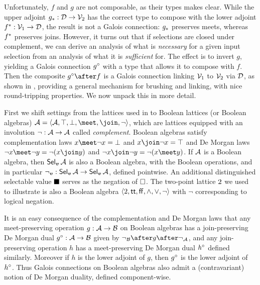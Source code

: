 
\vspace{-1mm}

\noindent Unfortunately, $f$ and $g$ are not composable, as their types makes clear. While the upper adjoint ${g}_*: \mathcal{D} \to \mathcal{V}_2$ has the correct type to compose with the lower adjoint ${f}^*: \mathcal{V}_1 \to \mathcal{D}$, the result is not a Galois connection: ${g}_*$ preserves meets, whereas ${f}^*$ preserves joins. However, it turns out that if selections are closed under complement, we can derive an analysis of what is \emph{necessary} for a given input selection from an analysis of what it is \emph{sufficient} for. The effect is to invert $g$, yielding a Galois connection ${g}^{\circ}$ with a type that allows it to compose with $f$. Then the composite $\dual{g} \after f$ is a Galois connection linking $\mathcal{V}_1$ to $\mathcal{V}_2$ via $\mathcal{D}$, as shown in , providing a general mechanism for brushing and linking, with nice round-tripping properties. We now unpack this in more detail.

First we shift settings from the lattices used in  to Boolean lattices (or Boolean algebras) $\Ann{A}= \BoolLattice{\Ann{A}}{\top}{\bot}{\meet}{\join}{\neg}$, which are lattices equipped with an involution $\neg: \mathcal{A} \to \mathcal{A}$ called \emph{complement}. Boolean algebras satisfy complementation laws $x \meet \neg x = \bot$ and $x \join \neg x = \top$ and De Morgan laws $\neg x \meet \neg y = \neg(x \join y)$ and $\neg x \join \neg y = \neg(x \meet y)$. If $\mathcal{A}$ is a Boolean algebra, then $\textup{\textsf{Sel}}_{\bm{v}}\,{\mathcal{A}}$ is also a Boolean algebra, with the Boolean operations, and in particular $\neg_{\bm{v}}: \textup{\textsf{Sel}}_{\bm{v}}\,{\mathcal{A}} \to \textup{\textsf{Sel}}_{\bm{v}}\,{\mathcal{A}}$, defined pointwise. An additional distinguished selectable value $\blacksquare$ serves as the negation of $\square$. The two-point lattice $2$ we used to illustrate  is also a Boolean algebra $\langle2,\mathsf{tt},\mathsf{ff},\wedge,\vee,\neg\rangle$ with $\neg$ corresponding to logical negation.



It is an easy consequence of the complementation and De Morgan laws that any meet-preserving operation $g: \mathcal{A} \to \mathcal{B}$ on Boolean algebras has a join-preserving De Morgan dual ${g}^{\circ}: \mathcal{A} \to \mathcal{B}$ given by $\neg_{\Ann{B}} \after g\after \neg_{\Ann{A}}$, and any join-preserving operation $h$ has a meet-preserving De Morgan dual ${h}^{\circ}$ defined similarly. Moreover if $h$ is the lower adjoint of $g$, then ${g}^{\circ}$ is the lower adjoint of ${h}^{\circ}$. Thus Galois connections on Boolean algebras also admit a (contravariant) notion of De Morgan duality, defined component-wise.

